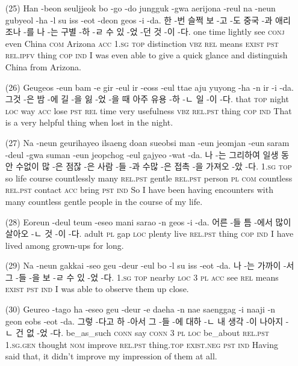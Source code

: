 \begin{itemize}
\item [(25)]
\tgl
		{Han -beon seuljjeok bo -go -do jungguk -gwa aerijona -reul na -neun gubyeol -ha -l su iss -eot -deon geos -i -da.}
		{한 -번 슬쩍 보 -고 -도 중국 -과 애리조나 -를 나 -는 구별 -하 -ㄹ 수 있 -었 -던 것 -이 -다.}
		{one	time	lightly	see	\textsc{conj}	even	China	\textsc{com}	Arizona	\textsc{acc}	\textsc{1.sg}	\textsc{top}	distinction	\textsc{vbz}	\textsc{rel}	means	\textsc{exist}	\textsc{pst}	\textsc{rel.ipfv}	thing	\textsc{cop}	\textsc{ind}}
		{I was even able to give a quick glance and distinguish China from Arizona.}

\item [(26)]
\tgl
		{Geugeos -eun bam -e gir -eul ir -eoss -eul ttae aju yuyong -ha -n ir -i -da.}
		{그것 -은 밤 -에 길 -을 잃 -었 -을 때 아주 유용 -하 -ㄴ 일 -이 -다.}
		{that	\textsc{top}	night	\textsc{loc}	way	\textsc{acc}	lose	\textsc{pst}	\textsc{rel}	time	very	usefulness	\textsc{vbz}	\textsc{rel.pst}	thing	\textsc{cop}	\textsc{ind}}
		{That is a very helpful thing when lost in the night.}

\item [(27)]
\tgl
		{Na -neun geurihayeo ilsaeng doan sueobsi man -eun jeomjan -eun saram -deul -gwa suman -eun jeopchog -eul gajyeo -wat -da.}
		{나 -는 그리하여 일생 동안 수없이 많 -은 점잖 -은 사람 -들 -과 수많 -은 접촉 -을 가져오 -았 -다.}
		{\textsc{1.sg}	\textsc{top}	so	life	course	countlessly	many	\textsc{rel.pst}	gentle	\textsc{rel.pst}	person	\textsc{pl}	\textsc{com}	countless	\textsc{rel.pst}	contact	\textsc{acc}	bring	\textsc{pst}	\textsc{ind}}
		{So I have been having encounters with many countless gentle people in the course of my life.}

\item [(28)]
\tgl
		{Eoreun -deul teum -eseo mani sarao -n geos -i -da.}
		{어른 -들 틈 -에서 많이 살아오 -ㄴ 것 -이 -다.}
		{adult	\textsc{pl}	gap	\textsc{loc}	plenty	live	\textsc{rel.pst}	thing	\textsc{cop}	\textsc{ind}}
		{I have lived among grown-ups for long.}

\pagebreak

\item [(29)]
\tgl
		{Na -neun gakkai -seo geu -deur -eul bo -l su iss -eot -da.}
		{나 -는 가까이 -서 그 -들 -을 보 -ㄹ 수 있 -었 -다.}
		{\textsc{1.sg}	\textsc{top}	nearby	\textsc{loc}	\textsc{3}	\textsc{pl}	\textsc{acc}	see	\textsc{rel}	means	\textsc{exist}	\textsc{pst}	\textsc{ind}}
		{I was able to observe them up close.}

\item [(30)]
\tgl
		{Geureo -tago ha -eseo geu -deur -e daeha -n nae saenggag -i naaji -n geon eobs -eot -da.}
		{그렇 -다고 하 -아서 그 -들 -에 대하 -ㄴ 내 생각 -이 나아지 -ㄴ 건 없 -었 -다.}
		{be\_as\_such	\textsc{conn}	say	\textsc{conn}	\textsc{3}	\textsc{pl}	\textsc{loc}	be\_about	\textsc{rel.pst}	\textsc{1.sg.gen}	thought	\textsc{nom}	improve	\textsc{rel.pst}	thing.\textsc{top}	\textsc{exist.neg}	\textsc{pst}	\textsc{ind}}
		{Having said that, it didn't improve my impression of them at all.}


\end{itemize}
